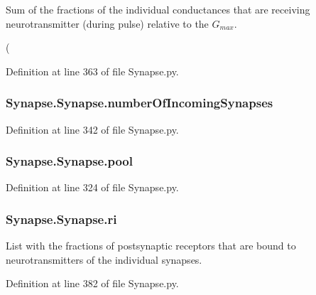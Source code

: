 Sum of the fractions of the individual conductances that are receiving neurotransmitter (during pulse) relative to the $G_{max}$. 

( 

Definition at line 363 of file Synapse.\+py.

\subsubsection[{\texorpdfstring{number\+Of\+Incoming\+Synapses}{numberOfIncomingSynapses}}]{\setlength{\rightskip}{0pt plus 5cm}Synapse.\+Synapse.\+number\+Of\+Incoming\+Synapses}\hypertarget{class_synapse_1_1_synapse_a6e55e008336cc47551669f3d77248d57}{}\label{class_synapse_1_1_synapse_a6e55e008336cc47551669f3d77248d57}


Definition at line 342 of file Synapse.\+py.

\subsubsection[{\texorpdfstring{pool}{pool}}]{\setlength{\rightskip}{0pt plus 5cm}Synapse.\+Synapse.\+pool}\hypertarget{class_synapse_1_1_synapse_a133990bf3ab7f1efa8b416be73d07a11}{}\label{class_synapse_1_1_synapse_a133990bf3ab7f1efa8b416be73d07a11}


Definition at line 324 of file Synapse.\+py.

\subsubsection[{\texorpdfstring{ri}{ri}}]{\setlength{\rightskip}{0pt plus 5cm}Synapse.\+Synapse.\+ri}\hypertarget{class_synapse_1_1_synapse_adc85234a081ad18bf19473be530dcf78}{}\label{class_synapse_1_1_synapse_adc85234a081ad18bf19473be530dcf78}


List with the fractions of postsynaptic receptors that are bound to neurotransmitters of the individual synapses. 



Definition at line 382 of file Synapse.\+py.

